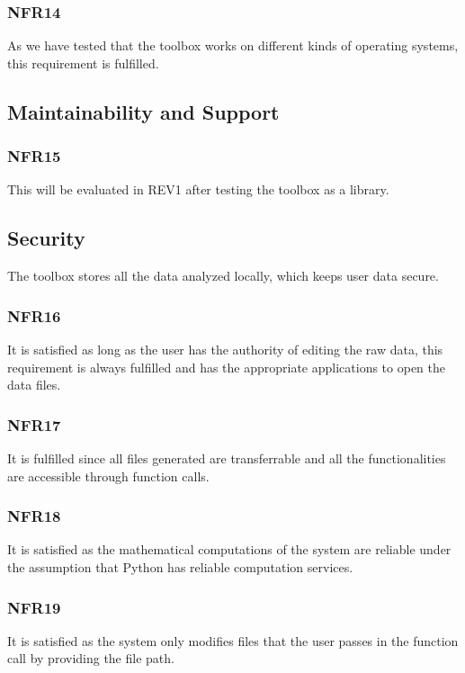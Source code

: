 \documentclass[12pt, titlepage]{article}
\begin{document}
\subsubsection{NFR14}
As we have tested that the toolbox works on different kinds of operating systems, this requirement is fulfilled. %

\subsection{Maintainability and Support}

\subsubsection{NFR15}
 This will be evaluated in REV1 after testing the toolbox as a library. 

\subsection{Security}
The toolbox stores all the data analyzed locally, which keeps user data secure.

\subsubsection{NFR16}
It is satisfied as long as the user has the authority of editing the raw data, this requirement is always fulfilled and has the appropriate applications to open the data files. 
\subsubsection{NFR17} 
It is fulfilled since all files generated are transferrable and all the functionalities are accessible through function calls. 
\subsubsection{NFR18}
It is satisfied as the mathematical computations of the system are reliable under the assumption that Python has reliable computation services. 
\subsubsection{NFR19} 
It is satisfied as the system only modifies files that the user passes in the function call by providing the file path.
\end{document}
